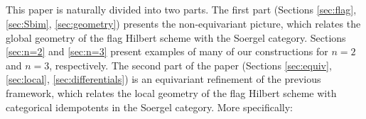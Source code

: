 \documentclass[12pt]{amsart}
\numberwithin{equation}{section}
\newtheorem{proposition}[theorem]{Proposition}
\newtheorem{conjecture}[theorem]{Conjecture}
\theoremstyle{definition}
\theoremstyle{remark}
\DeclareMathOperator{\FHilb}{FHilb}
\newcommand{\CC}{\mathbb{C}}
\newcommand{\CA}{\mathcal{A}}
\newcommand{\CHa}{\mathcal{H}^{\mathrm{alg}}}
\renewcommand{\1}{\mathbf{1}}
\begin{document}
 






\subsection{}

This paper is naturally divided into two parts. The first part (Sections \ref{sec:flag}, \ref{sec:Sbim}, \ref{sec:geometry}) presents the non-equivariant picture, which relates the global geometry of the flag Hilbert scheme with the Soergel category. Sections \ref{sec:n=2} and \ref{sec:n=3} present examples of many of our constructions for $n=2$ and $n=3$, respectively. The second part of the paper (Sections \ref{sec:equiv}, \ref{sec:local}, \ref{sec:differentials}) is an equivariant refinement of the previous framework, which relates the local geometry of the flag Hilbert scheme with categorical idempotents in the Soergel category. More specifically:
\end{document}
